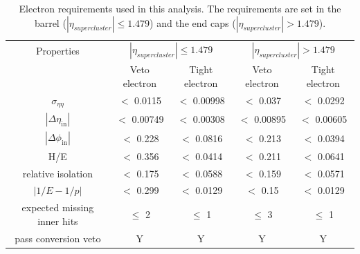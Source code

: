 \begin{table}[htbp]
	\centering
	
	\caption{Electron requirements used in this analysis. The requirements are set in the barrel ($|\eta_{supercluster}| \leq 1.479$)
		and the end caps ($|\eta_{supercluster}| > 1.479$). }
	\begin{tabular}{ccccc}
		\toprule
		Properties & \multicolumn{2}{c}{$|\eta_{supercluster}| \leq 1.479$ } & \multicolumn{2}{c}{$|\eta_{supercluster}| > 1.479$ } \\
		
		& Veto electron & Tight electron & Veto electron & Tight electron \\ 
	  \midrule
		$ \sigma_{\eta \eta}$ & $<$ 0.0115 & $<$ 0.00998 & $<$ 0.037 & $<$ 0.0292 \\ 
	
		$|\Delta \eta_{\mathrm{in}}|$ & $<$ 0.00749 & $<$ 0.00308 & $<$ 0.00895& $<$ 0.00605\\ 
	 
		$|\Delta \phi_{\mathrm{in}}|$ & $<$ 0.228 & $<$ 0.0816 & $<$ 0.213& $<$ 0.0394 \\ 
		
		H/E & $<$ 0.356 & $<$ 0.0414 & $<$ 0.211& $<$ 0.0641 \\ 
		
		relative isolation & $<$ 0.175 & $<$ 0.0588  & $<$ 0.159& $<$ 0.0571\\ 
	
		$|1/E-1/p|$ & $<$ 0.299 \GeVinv& $<$ 0.0129 \GeVinv& $<$ 0.15 \GeVinv&$<$ 0.0129 \GeVinv\\ 
	
		expected missing inner hits & $\leq $ 2 & $\leq $ 1 &  $\leq $ 3 &  $\leq $ 1\\ 
		
		pass conversion veto & Y & Y & Y & Y\\ 
		\bottomrule
	\end{tabular} 
	\label{tab:ElecReq}
\end{table}
\newpage


